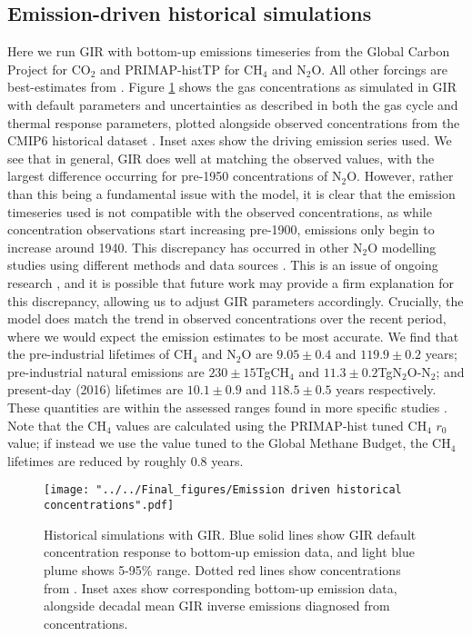 \documentclass[gmd, manuscript]{copernicus}
\begin{document}
\subsection*{Emission-driven historical simulations}
Here we run GIR with bottom-up emissions timeseries from the Global Carbon Project for CO$_2$ \citep{Quere2018} and PRIMAP-histTP \citep{Gutschow2016} for CH$_4$ and N$_2$O. All other forcings are best-estimates from \cite{Forster2013}. Figure \ref{fig:historicalconcs} shows the gas concentrations as simulated in GIR with default parameters and uncertainties as described in both the gas cycle and thermal response parameters, plotted alongside observed concentrations from the CMIP6 historical dataset \citep{Meinshausen2017}. Inset axes show the driving emission series used. We see that in general, GIR does well at matching the observed values, with the largest difference occurring for pre-1950 concentrations of N$_2$O. However, rather than this being a fundamental issue with the model, it is clear that the emission timeseries used is not compatible with the observed concentrations, as while concentration observations start increasing pre-1900, emissions only begin to increase around 1940. This discrepancy has occurred in other N$_2$O modelling studies using different methods and data sources \citep{Saikawa2014}. This is an issue of ongoing research \citep{Tian2018}, and it is possible that future work may provide a firm explanation for this discrepancy, allowing us to adjust GIR parameters accordingly. Crucially, the model does match the trend in observed concentrations over the recent period, where we would expect the emission estimates to be most accurate. We find that the pre-industrial lifetimes of CH$_4$ and N$_2$O are $9.05 \pm 0.4$ and $119.9 \pm 0.2$ years; pre-industrial natural emissions are $230 \pm 15$TgCH$_4$ and $11.3 \pm 0.2$TgN$_2$O-N$_2$; and present-day (2016) lifetimes are $10.1 \pm 0.9$ and $118.5 \pm 0.5$ years respectively. These quantities are within the assessed ranges found in more specific studies \citep{Prather2012,Prather2015,Holmes2013,Kirschke2013,Davidson2014,Arora2018}. Note that the CH$_4$ values are calculated using the PRIMAP-hist tuned CH$_4$ $r_0$ value; if instead we use the value tuned to the Global Methane Budget, the CH$_4$ lifetimes are reduced by roughly 0.8 years.
\begin{figure}[t]
    \texttt{[image: "../../Final\_figures/Emission driven historical concentrations".pdf]}
    \caption{Historical simulations with GIR. Blue solid lines show GIR default concentration response to bottom-up emission data, and light blue plume shows 5-95\% range. Dotted red lines show concentrations from \citeauthor{Meinshausen2017}. Inset axes show corresponding bottom-up emission data, alongside decadal mean GIR inverse emissions diagnosed from \citeauthor{Meinshausen2017} concentrations.}
    \label{fig:historicalconcs}
\end{figure}
\end{document}

